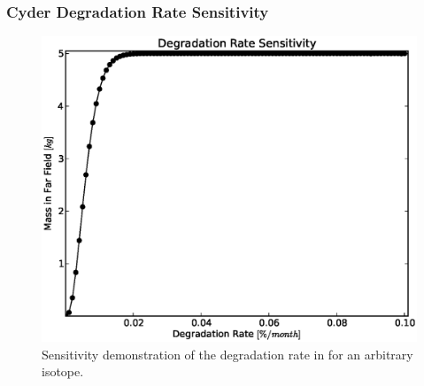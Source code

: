 \begin{frame}[ctb]
\frametitle{Cyder Degradation Rate Sensitivity}

\begin{figure}[htbp!]
\begin{center}
\includegraphics[width=0.7\linewidth]{./nuclide_demonstration/deg.eps}
\end{center}
\caption{Sensitivity demonstration of the degradation rate in \Cyder for an 
arbitrary isotope.}
\label{fig:deg}
\end{figure}
\end{frame}

